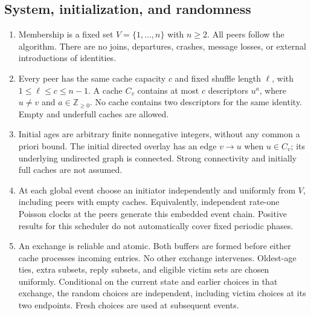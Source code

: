 \documentclass[11pt]{article}
\begin{document}
\subsection{System, initialization, and randomness}
\begin{enumerate}
\item Membership is a fixed set $V=\{1,\ldots,n\}$ with $n\ge2$.
All peers follow the algorithm. There are no joins, departures,
crashes, message losses, or external introductions of identities.
\item Every peer has the same cache capacity $c$ and fixed shuffle
length $\ell$, with $1\le\ell\le c\le n-1$. A cache $C_v$
contains at most $c$ descriptors $u^a$, where $u\ne v$ and
$a\in\mathbb Z_{\ge0}$. No cache contains two descriptors for
the same identity. Empty and underfull caches are allowed.
\item Initial ages are arbitrary finite nonnegative integers,
without any common a priori bound. The initial directed overlay
has an edge $v\to u$ when $u\in C_v$; its underlying undirected
graph is connected. Strong connectivity and initially full caches
are not assumed.
\item At each global event choose an initiator independently and
uniformly from $V$, including peers with empty caches. Equivalently,
independent rate-one Poisson clocks at the peers generate this
embedded event chain. Positive results for this scheduler do not
automatically cover fixed periodic phases.
\item An exchange is reliable and atomic. Both buffers are formed
before either cache processes incoming entries. No other exchange
intervenes. Oldest-age ties, extra subsets, reply subsets, and
eligible victim sets are chosen uniformly. Conditional on the
current state and earlier choices in that exchange, the random
choices are independent, including victim choices at its two
endpoints. Fresh choices are used at subsequent events.
\end{enumerate}
\end{document}
